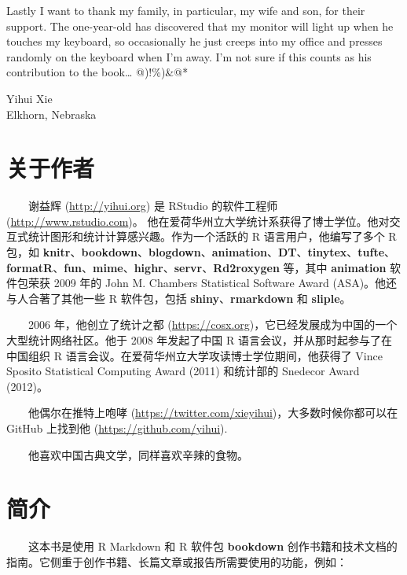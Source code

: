 \documentclass[
  12pt,
]{krantz}
\theoremstyle{definition}
\theoremstyle{definition}
\theoremstyle{definition}
\theoremstyle{definition}
\theoremstyle{remark}
\begin{document}
Lastly I want to thank my family, in particular, my wife and son, for their support. The one-year-old has discovered that my monitor will light up when he touches my keyboard, so occasionally he just creeps into my office and presses randomly on the keyboard when I'm away. I'm not sure if this counts as his contribution to the book\ldots{} @)!\%)\&@*

\begin{flushright}
Yihui Xie\\
Elkhorn, Nebraska
\end{flushright}

\hypertarget{ux5173ux4e8eux4f5cux8005}{%
\chapter*{关于作者}\label{ux5173ux4e8eux4f5cux8005}}


  谢益辉 (\url{http://yihui.org}) 是 RStudio 的软件工程师 (\url{http://www.rstudio.com})。 他在爱荷华州立大学统计系获得了博士学位。他对交互式统计图形和统计计算感兴趣。作为一个活跃的 R 语言用户，他编写了多个 R 包，如 \textbf{knitr}、\textbf{bookdown}、\textbf{blogdown}、\textbf{animation}、\textbf{DT}、\textbf{tinytex}、\textbf{tufte}、\textbf{formatR}、\textbf{fun}、\textbf{mime}、\textbf{highr}、\textbf{servr}、\textbf{Rd2roxygen} 等，其中 \textbf{animation} 软件包荣获 2009 年的 John M. Chambers Statistical Software Award (ASA)。他还与人合著了其他一些 R 软件包，包括 \textbf{shiny}、\textbf{rmarkdown} 和 \textbf{sliple}。

  2006 年，他创立了统计之都 (\url{https://cosx.org})，它已经发展成为中国的一个大型统计网络社区。他于 2008 年发起了中国 R 语言会议，并从那时起参与了在中国组织 R 语言会议。在爱荷华州立大学攻读博士学位期间，他获得了 Vince Sposito Statistical Computing Award (2011) 和统计部的 Snedecor Award (2012)。

  他偶尔在推特上咆哮 (\url{https://twitter.com/xieyihui})，大多数时候你都可以在 GitHub 上找到他 (\url{https://github.com/yihui}).

  他喜欢中国古典文学，同样喜欢辛辣的食物。

\mainmatter

\hypertarget{introduction}{%
\chapter{简介}\label{introduction}}

  这本书是使用 R Markdown \citep{R-rmarkdown} 和 R 软件包 \textbf{bookdown} \citep{R-bookdown} 创作书籍和技术文档的指南。它侧重于创作书籍、长篇文章或报告所需要使用的功能，例如：
\end{document}
